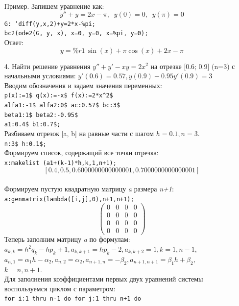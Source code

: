 \documentclass[article, bachelor, och, pract]{SCWorks}
\begin{document}
\begin{itemize}
Пример. Запишем уравнение как:
$$y''+y=2x-\pi, \;\; y(0)=0, \;\; y(\pi)=0$$
\texttt{G: 'diff(y,x,2)+y=2*x-\%pi;}\\
\texttt{bc2(ode2(G, y, x), x=0, y=0, x=\%pi, y=0);}\\
Ответ: \[y=\mathit{\%{}r1}\,\sin{(x)}+\ensuremath{\pi} \cos{(x)}+2x-\ensuremath{\pi} \]

\item[4.] Найти решение уравнения $y''+y'-xy=2x^2$ на отрезке [0.6; 0.9] (n=3) с начальными условиями: $y'(0.6)=0.57, y(0.9)-0.95y'(0.9)=3$\\
Вводим обозначения и задаем значения переменных:\\
\texttt{p(x):=1\$ q(x):=-x\$ f(x):=2*x\^{}2\$ \\
alfa1:-1\$ alfa2:0\$ ac:0.57\$ bc:3\$\\
beta1:1\$ beta2:-0.95\$\\
a1:0.4\$ b1:0.7\$;}\\
Разбиваем отрезок [a, b] на равные части с шагом $h=0.1, n=3$.\\
\texttt{n:3\$ h:0.1\$;}\\
Формируем список, содержащий все точки отрезка:\\
\texttt{x:makelist (a1+(k-1)*h,k,1,n+1);}\\
\[[0.4,0.5,0.6000000000000001,0.7000000000000001]\]\\
Формируем пустую квадратную матрицу \emph{a} размера \emph{n+1}:\\
\texttt{a:genmatrix(lambda([i,j],0),n+1,n+1);}\\
$$\begin{pmatrix}
0 & 0 & 0 & 0\\
0 & 0 & 0 & 0\\
0 & 0 & 0 & 0\\
0 & 0 & 0 & 0
\end{pmatrix}$$
Теперь заполним матрицу \emph{a} по формулам:\\
\(a_{k,k}=h^2q_{k}-hp_{k}+1,
a_{k,k+1}=hp_{k}-2,
a_{k,k+2}=1, k=1, n-1,\) \\
\(a_{n,1}=\alpha_{1}h-\alpha_{2},
a_{n,2}=\alpha_{2}, a_{n+1,n}=-\beta_{2},
a_{n+1,n+1}=\beta_{1}h+\beta_{2},\) \\
\(k=n,n+1.\)\\
Для заполнения коэффициентами первых двух уравнений системы воспользуемся циклом с параметром:\\
\texttt{for i:1 thru n-1 do for j:1 thru n+1 do\\
}
\end{itemize}
\end{document}
